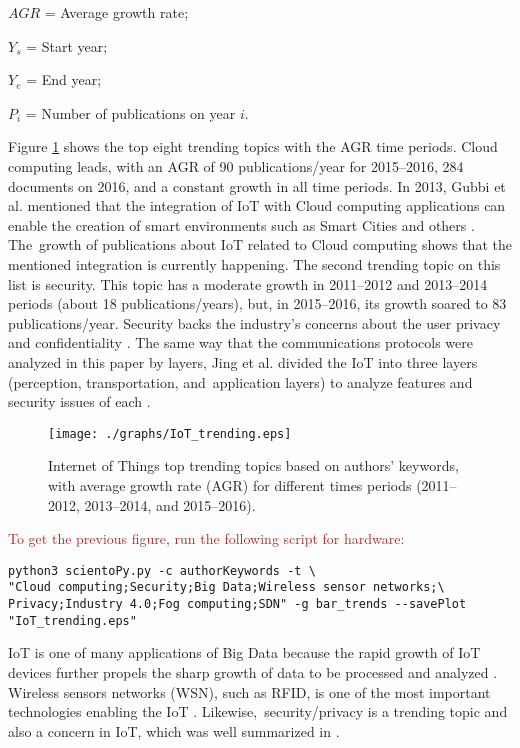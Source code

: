\documentclass[symmetry,article,accept,moreauthors,pdftex10pt,a4paper]{mdpi}
\begin{document}
$AGR$ = Average growth rate;
	
	$Y_s$ = Start year;
	
	$Y_e$ = End year;
	
	$P_i$ = Number of publications on year $i.$
\newline

Figure \ref{fig_trending} shows the top eight trending topics with the AGR time periods. Cloud computing leads, with an AGR of 90 publications/year for 2015--2016, 284 documents on 2016, and a constant growth in all time periods. In 2013, Gubbi et al. mentioned that the integration of IoT with Cloud computing applications can enable the creation of smart environments such as Smart Cities and others \cite{Gubbi20131645}. The~growth of publications about IoT related to Cloud computing shows that the mentioned integration is currently happening. The second trending topic on this list is security. This topic has a moderate growth in 2011--2012 and 2013--2014 periods (about 18 publications/years), but, in 2015--2016, its growth soared to 83 publications/year. Security backs the industry's concerns about the user privacy and confidentiality \cite{Zhang2018,Suo2012648}. The same way that the communications protocols were analyzed in this paper by layers, Jing et al. divided the IoT into three layers (perception, transportation, and~application layers) to analyze features and security issues of each \cite{Jing2014}.

\begin{figure}[H]
	\centering
	\texttt{[image: ./graphs/IoT\_trending.eps]}
	\caption{Internet of Things top trending topics based on authors' keywords, with average growth rate (AGR) for different times periods (2011--2012, 2013--2014, and 2015--2016).}
	\label{fig_trending}
\end{figure} 

\noindent
\textcolor{brown}{To get the previous figure, run the following script for hardware:}\\
\begin{verbatim}
python3 scientoPy.py -c authorKeywords -t \
"Cloud computing;Security;Big Data;Wireless sensor networks;\
Privacy;Industry 4.0;Fog computing;SDN" -g bar_trends --savePlot "IoT_trending.eps"
\end{verbatim}


IoT is one of many applications of Big Data because the rapid growth of IoT devices further propels the sharp growth of data to be processed and analyzed \cite{Chen2014171}. Wireless sensors networks (WSN), such as RFID, is one of the most important technologies enabling the IoT \cite{ROMAN2011147}. Likewise,~security/privacy is a trending topic and also a concern in IoT, which was well summarized in \cite{Ziegeldorf20142728}.
\end{document}

